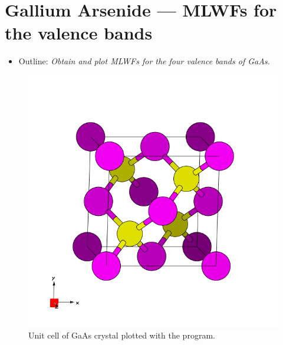 \section{Gallium Arsenide --- MLWFs for the valence bands}
\label{sec1:GaAs}
\begin{itemize}
\item Outline: {\it Obtain and plot MLWFs for the four valence bands of GaAs.}
\end{itemize}

\begin{figure}[h!]
\centering
\includegraphics[width=0.25\columnwidth,trim={45pt 45pt 55pt 55pt},clip]{figure/example01/GaAs.png}
\caption{Unit cell of GaAs crystal plotted with the \xcrysden{} program.}
\label{fig1}
\end{figure}

